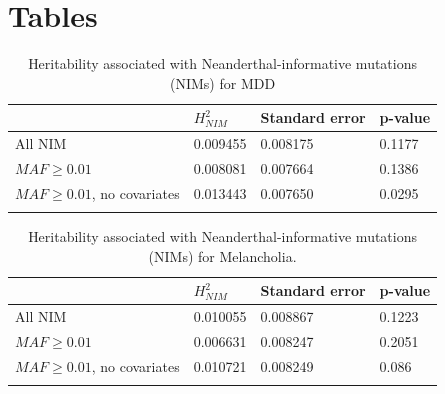 \FloatBarrier
\clearpage
\section{Tables}
\begin{longtable}[]{@{}llll@{}}
\toprule
\endhead
& $H^2_{NIM}$ & Standard error & p-value\tabularnewline
\bottomrule
All NIM & 0.009455 & 0.008175 & 0.1177\tabularnewline
$MAF \ge 0.01$ & 0.008081 & 0.007664 & 0.1386\tabularnewline
$MAF\ge 0.01$, no covariates & 0.013443 & 0.007650 & 0.0295\tabularnewline
\bottomrule
\caption{Heritability associated with Neanderthal-informative mutations
(NIMs) for MDD}
\label{table:2.1}
\end{longtable}

\begin{longtable}[]{@{}llll@{}}
\toprule
\endhead
& $H^2_{NIM}$& Standard error & p-value\tabularnewline
\bottomrule
All NIM & 0.010055 & 0.008867 & 0.1223\tabularnewline
$MAF \ge 0.01$ & 0.006631 & 0.008247 &
0.2051\tabularnewline
$MAF \ge 0.01$, no covariates & 0.010721 & 0.008249 & 0.086\tabularnewline
\bottomrule
\caption{Heritability associated with Neanderthal-informative mutations (NIMs) for Melancholia.}
\label{table:2.2}
\end{longtable}

